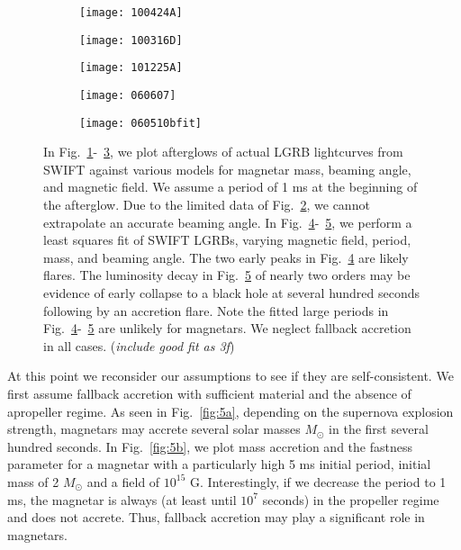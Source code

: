 \documentclass{article}
\begin{document}
\begin{figure}[h!]
\centering
\begin{subfigure}{.5\textwidth}
    \centering
    \texttt{[image: 100424A]}
    \caption{}
    \label{fig:3a}
\end{subfigure}%
\begin{subfigure}{.5\textwidth}
    \centering
    \texttt{[image: 100316D]}
    \caption{}
    \label{fig:3b}
\end{subfigure}
\begin{subfigure}{.5\textwidth}
    \centering
    \texttt{[image: 101225A]}
    \caption{}
    \label{fig:3c}
\end{subfigure}%
\begin{subfigure}{.5\textwidth}
    \centering
    \texttt{[image: 060607]}
    \caption{}
    \label{fig:3d}
\end{subfigure}
\begin{subfigure}{.5\textwidth}
    \centering
    \texttt{[image: 060510bfit]}
    \caption{}
    \label{fig:3e}
\end{subfigure}
\caption{In Fig.~\ref{fig:3a}-~\ref{fig:3c}, we plot afterglows of actual LGRB lightcurves from SWIFT against various models for magnetar mass, beaming angle, and magnetic field. We assume a period of 1 ms at the beginning of the afterglow. Due to the limited data of Fig.~\ref{fig:3b}, we cannot extrapolate an accurate beaming angle. In Fig.~\ref{fig:3d}-~\ref{fig:3e}, we perform a least squares fit of SWIFT LGRBs, varying magnetic field, period, mass, and beaming angle. The two early peaks in Fig.~\ref{fig:3d} are likely flares. The luminosity decay in Fig.~\ref{fig:3e} of nearly two orders may be evidence of early collapse to a black hole at several hundred seconds following by an accretion flare. Note the fitted large periods in Fig.~\ref{fig:3d}-~\ref{fig:3e} are unlikely for magnetars. We neglect fallback accretion in all cases. (\textit{include good fit as 3f})}
\label{fig:3}
\end{figure}

\newpage
At this point we reconsider our assumptions to see if they are self-consistent. We first assume fallback accretion with sufficient material and the absence of apropeller regime. As seen in Fig.~\ref{fig:5a}, depending on the supernova explosion strength,  magnetars may accrete several solar masses $M_{\odot}$ in the first several hundred seconds. In Fig.~\ref{fig:5b}, we plot mass accretion and the fastness parameter for a magnetar with a particularly high 5 ms initial period, initial mass of 2 $M_{\odot}$ and a field of $10^{15}$ G. Interestingly, if we decrease the period to 1 ms, the magnetar is always (at least until $10^7$ seconds) in the propeller regime and does not accrete. Thus, fallback accretion may play a significant role in  magnetars.
\end{document}
